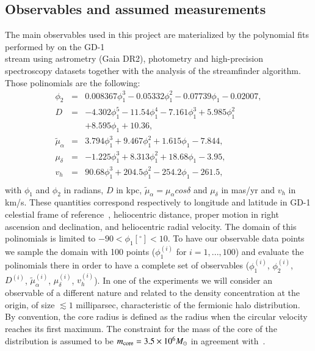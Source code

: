 \documentclass[twocolumn]{aa}
\begin{document}
\subsection{Observables and assumed measurements}
\label{sec:observables}

The main observables used in this project are materialized by the polynomial fits performed by
\citet{Ibata_2020} on the GD-1\\ stream using astrometry (Gaia DR2), photometry and high-precision spectroscopy datasets together with the analysis of the {\sc streamfinder} algorithm.
Those polinomials are the following:
\begin{eqnarray}
   \label{Ibata_polyn}
   \phi_2  &=& 0.008367\phi_1^3-0.05332\phi_1^2-0.07739\phi_1-0.02007, \\
   D &=& -4.302\phi_1^5-11.54\phi_1^4-7.161\phi_1^3 +5.985\phi_1^2 \nonumber\\
      &&+ 8.595\phi_1+10.36,\\
   \tilde{\mu}_\alpha &=& 3.794\phi_1^3+9.467\phi_1^2+1.615\phi_1-7.844,\\
   \mu_\delta &=& -1.225\phi_1^3+8.313\phi_1^2+18.68\phi_1-3.95,\\
   v_h &=&  90.68\phi_1^3+204.5\phi_1^2-254.2\phi_1-261.5,\\
   \label{Ibata_polynb}
\end{eqnarray}
with $\phi_1$ and $\phi_2$ in radians, $D$ in kpc, $\tilde{\mu}_\alpha=\mu_\alpha cos \delta$ and $\mu_\delta$ in mas/yr and $v_h$ in km/s. These quantities correspond respectively to longitude and latitude in GD-1 celestial frame of reference~\citep{Koposov_2010}, heliocentric distance, proper motion in right ascension and declination, and heliocentric radial velocity.
The domain of this polinomials is limited to $-90<\phi_1[^\circ]<10$.
To have our observable data points we sample the domain with 100 points ($\phi_1^{(i)}$ for $i=1,...,100$)
and evaluate the polinomials there in order to have a complete set of observables ($\phi_1^{(i)}$, $\phi_2^{(i)}$, $D^{(i)}$, $\tilde{\mu}_\alpha^{(i)}$, $\mu_\delta^{(i)}$, $v_h^{(i)}$).
In one of the experiments we will consider an observable of a different nature
and related to the density concentration at the origin, of size $\lesssim 1$ milliparsec,
characteristic of the fermionic halo distribution. By convention, the core radius is defined
as the radius when the circular velocity reaches its first maximum.
The constraint for the mass of the core of the distribution is assumed to be $m_{\rm{core}}=3.5\times10^6 M_\odot$ in agreement with~\citet{2020A&A...641A..34B,2021MNRAS.505L..64B,2022MNRAS.511L..35A}.
\end{document}
